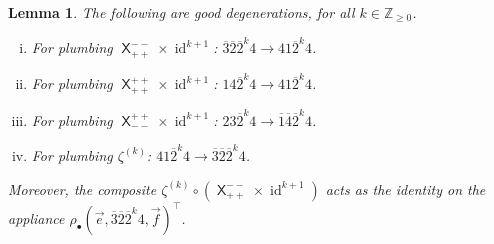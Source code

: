 \documentclass{amsart}
\newtheorem{lemma}[theorem]{Lemma}
\theoremstyle{definition}
\theoremstyle{remark}
\numberwithin{equation}{section}
\DeclareMathOperator{\id}{id}
\DeclareMathOperator{\sfX}{\mathsf{X}}
\begin{document}
\begin{lemma}\label{lem:long_good_degens}
  The following are good degenerations, for all $k \in \mathbb{Z}_{\geq 0}$.
  \begin{enumerate}[(i)]
    \item For plumbing $\sfX^{--}_{++} \times \id^{k+1}$: $\overline{3}\overline{2}\overline{2}^k4 \to 41\overline{2}^k4$.
    \item For plumbing $\sfX^{++}_{++} \times \id^{k+1}$: $14\overline{2}^k4 \to 41\overline{2}^k4$.
    \item For plumbing $\sfX^{++}_{--} \times \id^{k+1}$: $23\overline{2}^k4 \to \overline{1}\overline{4}\overline{2}^k4$.
    \item For plumbing $\zeta^{(k)}$: $41\overline{2}^k4 \to \overline{3}\overline{2}\overline{2}^k4$.
  \end{enumerate}
  Moreover, the composite $\zeta^{(k)} \circ (\sfX^{--}_{++} \times \id^{k+1})$ acts as the identity on the appliance $\rho_\bullet(\vec{e}, \overline{3}\overline{2}\overline{2}^k4, \vec{f})^\top$.
\end{lemma}
\end{document}
